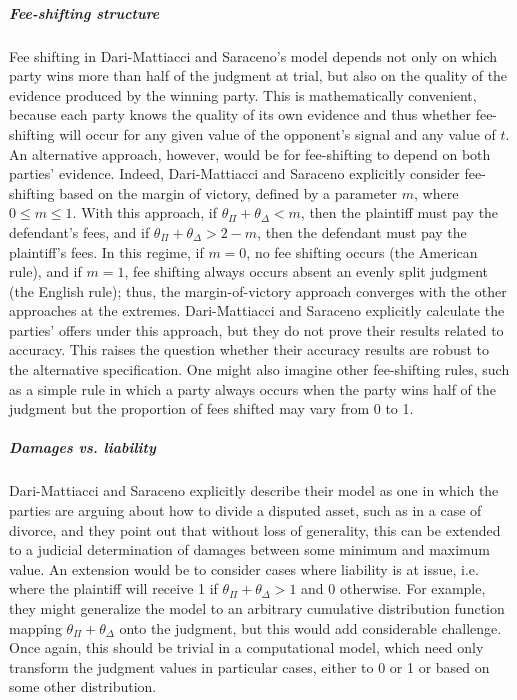 \documentclass{article}
\begin{document}
\subparagraph{Fee-shifting structure}Fee shifting in Dari-Mattiacci and Saraceno's model depends not only on which party wins more than half of the judgment at trial, but also on the quality of the evidence produced by the winning party. This is mathematically convenient, because each party knows the quality of its own evidence and thus whether fee-shifting will occur for any given value of the opponent's signal and any value of $t$. An alternative approach, however, would be for fee-shifting to depend on both parties' evidence. Indeed, Dari-Mattiacci and Saraceno explicitly consider fee-shifting based on the margin of victory, defined by a parameter $m$, where $0 \leq m \leq 1$. With this approach, if $\theta_\Pi + \theta_\Delta < m$, then the plaintiff must pay the defendant's fees, and if $\theta_\Pi + \theta_\Delta > 2 - m$, then the defendant must pay the plaintiff's fees. In this regime, if $m = 0$, no fee shifting occurs (the American rule), and if $m = 1$, fee shifting always occurs absent an evenly split judgment (the English rule); thus, the margin-of-victory approach converges with the other approaches at the extremes. Dari-Mattiacci and Saraceno explicitly calculate the parties' offers under this approach, but they do not prove their results related to accuracy. This raises the question whether their accuracy results are robust to the alternative specification. One might also imagine other fee-shifting rules, such as a simple rule in which a party always occurs when the party wins half of the judgment but the proportion of fees shifted may vary from 0 to 1.

\subparagraph{Damages vs. liability}Dari-Mattiacci and Saraceno explicitly describe their model as one in which the parties are arguing about how to divide a disputed asset, such as in a case of divorce, and they point out that without loss of generality, this can be extended to a judicial determination of damages between some minimum and maximum value. An extension would be to consider cases where liability is at issue, i.e. where the plaintiff will receive 1 if $\theta_\Pi + \theta_\Delta > 1$ and 0 otherwise. For example, they might generalize the model to an arbitrary cumulative distribution function mapping $\theta_\Pi + \theta_\Delta$ onto the judgment, but this would add considerable challenge. Once again, this should be trivial in a computational model, which need only transform the judgment values in particular cases, either to 0 or 1 or based on some other distribution.   
\end{document}
